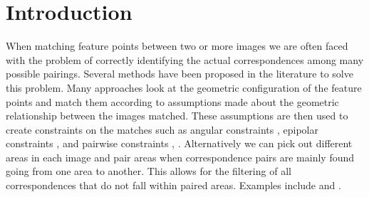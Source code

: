 \documentclass[conference]{IEEEtran}
\begin{document}
\section{Introduction}
%
When matching feature points between two or more images we are often 
faced with the problem of correctly identifying the actual 
correspondences among many possible pairings. Several methods have been 
proposed in the literature to solve this problem. Many approaches look 
at the geometric configuration of the feature points and match them 
according to assumptions made about the geometric relationship between 
the images matched. These assumptions are then used to create 
constraints on the matches such as angular constraints 
\cite{kim2008efficient}, epipolar constraints \cite{torr2000mlesac}, 
\cite{chum2005matching} and pairwise constraints \cite{choi2009robust}, 
\cite{leordeanu2005spectral}.
%
%
Alternatively we can pick out different areas in each image and pair 
areas when correspondence pairs are mainly found going from one area to 
another. This allows for the filtering of all correspondences that do 
not fall within paired areas. Examples include \cite{das2008event} and 
\cite{wu2011robust}.
\end{document}

